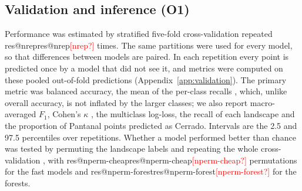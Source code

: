 \documentclass[10pt,a4paper,twocolumn]{article}
\makeatletter
\newcommand{\res}[1]{\ifcsname res@#1\endcsname\csname res@#1\endcsname\else\textcolor{red}{[#1?]}\fi}
\makeatother
\begin{document}
\subsection{Validation and inference (O1)}\label{sec:mvalidation}
Performance was estimated by stratified five-fold cross-validation repeated \res{nrep} times. The
same partitions were used for every model, so that differences between models are paired. In each
repetition every point is predicted once by a model that did not see it, and metrics were computed
on these pooled out-of-fold predictions (Appendix~\ref{app:validation}). The primary metric was
balanced accuracy, the mean of the per-class recalls \citep{brodersen2010}, which, unlike overall
accuracy, is not inflated by the larger classes; we also report macro-averaged $F_1$, Cohen's
$\kappa$ \citep{cohen1960}, the multiclass log-loss, the recall of each landscape and the proportion
of Pantanal points predicted as Cerrado. Intervals are the 2.5 and 97.5 percentiles over
repetitions. Whether a model performed better than chance was tested by permuting the landscape
labels and repeating the whole cross-validation \citep{ojala2010}, with \res{nperm-cheap}
permutations for the fast models and \res{nperm-forest} for the forests.
\end{document}
